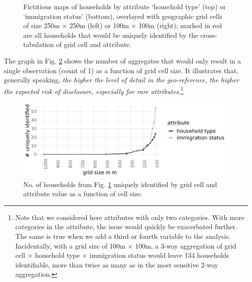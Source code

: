 \begin{figure}[H]
    \caption{Fictitious maps of households by attribute `household type' (top) or `immigration status' (bottom), overlayed with geographic grid cells of size 250m $\times$ 250m (left) or 100m $\times$ 100m (right); marked in red are all households that would be uniquely identified by the cross-tabulation of grid cell and attribute.}
    \label{fig:ExaResMaps}
\end{figure}

The graph in Fig. \ref{fig:ExaResGraph} shows the number of aggregates that would only result in a single observation (count of 1) as a function of grid cell size. It illustrates that, generally speaking, \textit{the higher the level of detail in the geo-reference, the higher the expected risk of disclosure, especially for rare attributes}.\footnote{
    Note that we considered here attributes with only two categories. With more categories in the attribute, the issue would quickly be exacerbated further. The same is true when we add a third or fourth variable to the analysis. Incidentally, with a grid size of 100m $\times$ 100m, a 3-way aggregation of grid cell $\times$ household type $\times$ immigration status would leave 134 households identifiable, more than twice as many as in the most sensitive 2-way aggregation.
}
\begin{figure}
    \centering
    \includegraphics[width=\linewidth]{figures/ExaGraph_res2.png}
    \caption{No. of households from Fig. \ref{fig:ExaResMaps} uniquely identified by grid cell and attribute value as a function of cell size.}
    \label{fig:ExaResGraph}
\end{figure}


